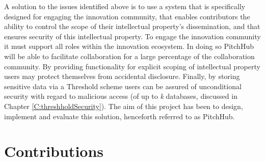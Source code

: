 A solution to the issues identified above is to use a system that is specifically designed for engaging the innovation community, that enables contributors the ability to control the scope of their intellectual property's dissemination, and that ensures security of this intellectual property. To engage the innovation community it must support all roles within the innovation ecosystem. In doing so PitchHub will be able to facilitate collaboration for a large percentage of the collaboration community. By providing functionality for explicit scoping of intellectual property users may protect themselves from accidental disclosure. Finally, by storing sensitive data via a Threshold scheme users can be assured of unconditional security with regard to malicious access (of up to \textit{k} databases, discussed in Chapter \ref{C:threshholdSecurity}).
The aim of this project has been to design, implement and evaluate this solution, henceforth referred to as PitchHub.

\section{Contributions}

